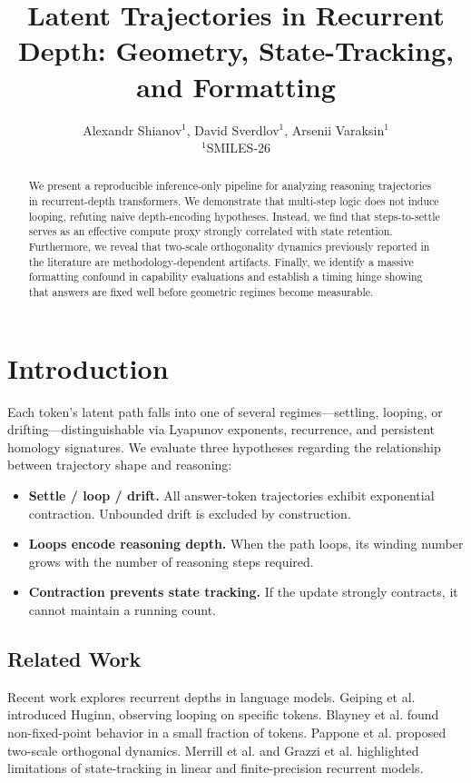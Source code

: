 \documentclass{article}
\title{Latent Trajectories in Recurrent Depth: Geometry, State-Tracking, and Formatting}
\author{
  Alexandr Shianov$^{1}$, David Sverdlov$^{1}$, Arsenii Varaksin$^{1}$ \\
  \small $^{1}$SMILES-26
}
\date{}
\begin{document}
\maketitle

\begin{abstract}
We present a reproducible inference-only pipeline for analyzing reasoning trajectories in recurrent-depth transformers. We demonstrate that multi-step logic does not induce looping, refuting naive depth-encoding hypotheses. Instead, we find that steps-to-settle serves as an effective compute proxy strongly correlated with state retention. Furthermore, we reveal that two-scale orthogonality dynamics previously reported in the literature are methodology-dependent artifacts. Finally, we identify a massive formatting confound in capability evaluations and establish a timing hinge showing that answers are fixed well before geometric regimes become measurable.
\end{abstract}

\section{Introduction}

Each token's latent path falls into one of several regimes---settling, looping, or drifting---distinguishable via Lyapunov exponents, recurrence, and persistent homology signatures. We evaluate three hypotheses regarding the relationship between trajectory shape and reasoning:
\begin{itemize}
    \item[H1] \textbf{Settle / loop / drift.} All answer-token trajectories exhibit exponential contraction. Unbounded drift is excluded by construction.
    \item[H2] \textbf{Loops encode reasoning depth.} When the path loops, its winding number grows with the number of reasoning steps required.
    \item[H3] \textbf{Contraction prevents state tracking.} If the update strongly contracts, it cannot maintain a running count.
\end{itemize}

\subsection{Related Work}
Recent work explores recurrent depths in language models. Geiping et al. introduced Huginn, observing looping on specific tokens. Blayney et al. found non-fixed-point behavior in a small fraction of tokens. Pappone et al. proposed two-scale orthogonal dynamics. Merrill et al. and Grazzi et al. highlighted limitations of state-tracking in linear and finite-precision recurrent models.
\end{document}
